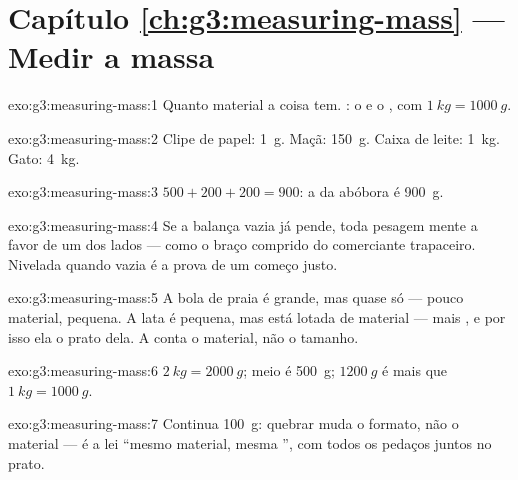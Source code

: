 \section*{Capítulo \ref{ch:g3:measuring-mass} --- Medir a massa}

\begin{solution}{exo:g3:measuring-mass:1}
Quanto material a coisa tem. : o  e o , com
$\qty{1}{kg} = \qty{1000}{g}$.
\end{solution}

\begin{solution}{exo:g3:measuring-mass:2}
Clipe de papel: \qty{1}{g}. Maçã: \qty{150}{g}. Caixa de leite:
\qty{1}{kg}. Gato: \qty{4}{kg}.
\end{solution}

\begin{solution}{exo:g3:measuring-mass:3}
$500 + 200 + 200 = 900$: a  da abóbora é \qty{900}{g}.
\end{solution}

\begin{solution}{exo:g3:measuring-mass:4}
Se a balança vazia já pende, toda pesagem mente a favor de um dos
lados --- como o braço comprido do comerciante trapaceiro. Nivelada
quando vazia é a prova de um começo justo.
\end{solution}

\begin{solution}{exo:g3:measuring-mass:5}
A bola de praia é grande, mas quase só  --- pouco material, 
pequena. A lata é pequena, mas está lotada de material --- mais
, e por isso ela  o prato dela. A  conta o material,
não o tamanho.
\end{solution}

\begin{solution}{exo:g3:measuring-mass:6}
$\qty{2}{kg} = \qty{2000}{g}$; meio  é \qty{500}{g};
$\qty{1200}{g}$ é mais que $\qty{1}{kg} = \qty{1000}{g}$.
\end{solution}

\begin{solution}{exo:g3:measuring-mass:7}
Continua \qty{100}{g}: quebrar muda o formato, não o material --- é a
lei ``mesmo material, mesma '', com todos os pedaços juntos no
prato.
\end{solution}

